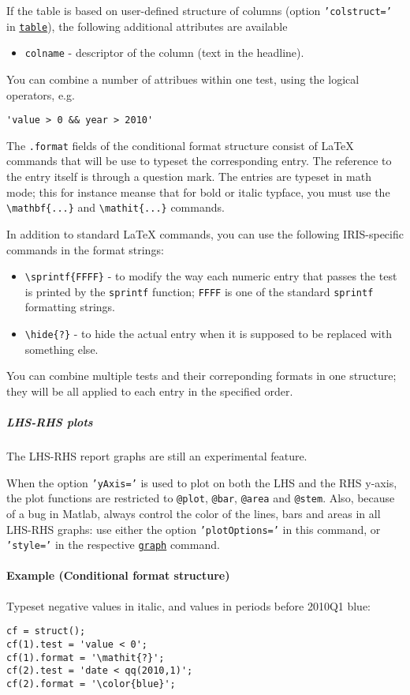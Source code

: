 If the table is based on user-defined structure of columns (option
\texttt{'colstruct='} in \href{report/table}{\texttt{table}}), the
following additional attributes are available

\begin{itemize}
\itemsep1pt\parskip0pt
\item
  \texttt{colname} - descriptor of the column (text in the headline).
\end{itemize}

You can combine a number of attribues within one test, using the logical
operators, e.g.

\begin{verbatim}
'value > 0 && year > 2010'
\end{verbatim}

The \texttt{.format} fields of the conditional format structure consist
of LaTeX commands that will be use to typeset the corresponding entry.
The reference to the entry itself is through a question mark. The
entries are typeset in math mode; this for instance meanse that for bold
or italic typface, you must use the
\texttt{\textbackslash{}mathbf\{...\}} and
\texttt{\textbackslash{}mathit\{...\}} commands.

In addition to standard LaTeX commands, you can use the following
IRIS-specific commands in the format strings:

\begin{itemize}
\item
  \texttt{\textbackslash{}sprintf\{FFFF\}} - to modify the way each
  numeric entry that passes the test is printed by the \texttt{sprintf}
  function; \texttt{FFFF} is one of the standard \texttt{sprintf}
  formatting strings.
\item
  \texttt{\textbackslash{}hide\{?\}} - to hide the actual entry when it
  is supposed to be replaced with something else.
\end{itemize}

You can combine multiple tests and their correponding formats in one
structure; they will be all applied to each entry in the specified
order.

\subparagraph{LHS-RHS plots}

The LHS-RHS report graphs are still an experimental feature.

When the option \texttt{'yAxis='} is used to plot on both the LHS and
the RHS y-axis, the plot functions are restricted to \texttt{@plot},
\texttt{@bar}, \texttt{@area} and \texttt{@stem}. Also, because of a bug
in Matlab, always control the color of the lines, bars and areas in all
LHS-RHS graphs: use either the option \texttt{'plotOptions='} in this
command, or \texttt{'style='} in the respective
\href{report/graph}{\texttt{graph}} command.

\paragraph{Example (Conditional format
structure)}

Typeset negative values in italic, and values in periods before 2010Q1
blue:

\begin{verbatim}
cf = struct();
cf(1).test = 'value < 0';
cf(1).format = '\mathit{?}';
cf(2).test = 'date < qq(2010,1)';
cf(2).format = '\color{blue}';
\end{verbatim}


